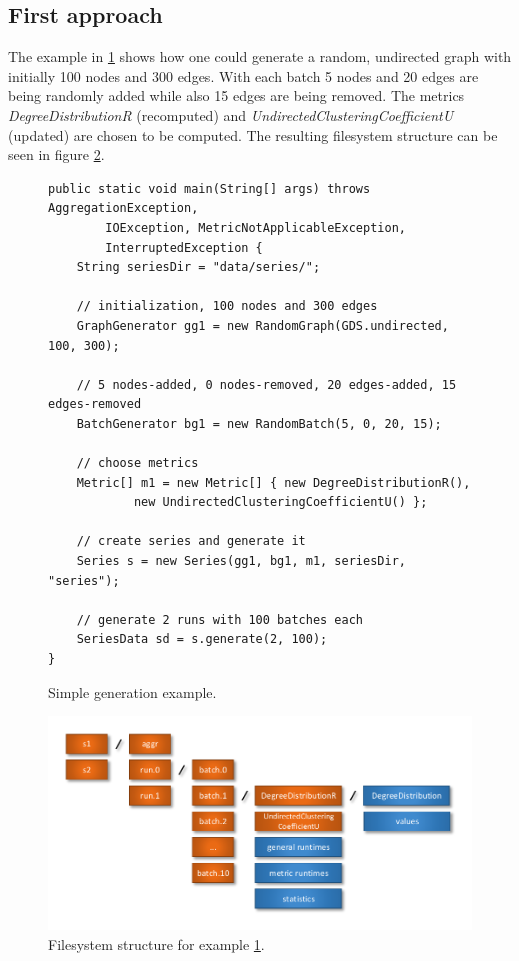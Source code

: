 \subsection{First approach}
The example in \ref{code:example1} shows how one could generate a random, undirected graph with initially 100 nodes and 300 edges. With each batch 5 nodes and 20 edges are being randomly added while also 15 edges are being removed. The metrics \textit{DegreeDistributionR} (recomputed) and \textit{UndirectedClusteringCoefficientU} (updated) are chosen to be computed. The resulting filesystem structure can be seen in figure \ref{fig:fs-struct-val}.
\begin{figure} [h]
\begin{lstlisting}
public static void main(String[] args) throws AggregationException,
		IOException, MetricNotApplicableException,
		InterruptedException {
	String seriesDir = "data/series/";

	// initialization, 100 nodes and 300 edges
	GraphGenerator gg1 = new RandomGraph(GDS.undirected, 100, 300);
	
	// 5 nodes-added, 0 nodes-removed, 20 edges-added, 15 edges-removed
	BatchGenerator bg1 = new RandomBatch(5, 0, 20, 15);
	
	// choose metrics
	Metric[] m1 = new Metric[] { new DegreeDistributionR(),
			new UndirectedClusteringCoefficientU() };

	// create series and generate it
	Series s = new Series(gg1, bg1, m1, seriesDir, "series");
	
	// generate 2 runs with 100 batches each
	SeriesData sd = s.generate(2, 100);
}
\end{lstlisting}
\caption{Simple generation example.}
\label{code:example1}
\end{figure}
\begin{figure} [h]
\centering
\includegraphics [scale=1] {images/fs-struct-val}
\caption{Filesystem structure for example \ref{code:example1}.}
\label{fig:fs-struct-val}
\end{figure}

